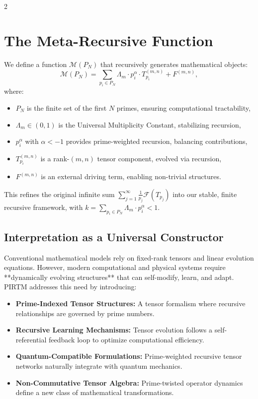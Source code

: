 \documentclass{article}
\theoremstyle{plain}
\begin{document}
\newpage
 \begin{multicols}{2}
\begin{singlespace}
\tableofcontents
\end{singlespace}
\end{multicols}
 \newpage



\section{The Meta-Recursive Function}
We define a function \( \mathcal{M}(P_N) \) that recursively generates mathematical objects:
\begin{equation}
    \mathcal{M}(P_N) = \sum_{p_i \in P_N} \Lambda_m \cdot p_i^\alpha \cdot T_{p_i}^{(m,n)} + F^{(m,n)},
\end{equation}
where:
\begin{itemize}
    \item \( P_N \) is the finite set of the first \( N \) primes, ensuring computational tractability,
    \item \( \Lambda_m \in (0, 1) \) is the Universal Multiplicity Constant, stabilizing recursion,
    \item \( p_i^\alpha \) with \( \alpha < -1 \) provides prime-weighted recursion, balancing contributions,
    \item \( T_{p_i}^{(m,n)} \) is a rank-$(m,n)$ tensor component, evolved via recursion,
    \item \( F^{(m,n)} \) is an external driving term, enabling non-trivial structures.
\end{itemize}
This refines the original infinite sum \( \sum_{j=1}^\infty \frac{1}{p_j} \mathcal{F}(T_{p_j}) \) into our stable, finite recursive framework, with \( k = \sum_{p_i \in P_N} \Lambda_m \cdot p_i^\alpha < 1 \).

\subsection{Interpretation as a Universal Constructor}
Conventional mathematical models rely on fixed-rank tensors and linear evolution equations. However, modern computational and physical systems require **dynamically evolving structures** that can self-modify, learn, and adapt. PIRTM addresses this need by introducing:
\begin{itemize}
    \item \textbf{Prime-Indexed Tensor Structures:} A tensor formalism where recursive relationships are governed by prime numbers.
    \item \textbf{Recursive Learning Mechanisms:} Tensor evolution follows a self-referential feedback loop to optimize computational efficiency.
    \item \textbf{Quantum-Compatible Formulations:} Prime-weighted recursive tensor networks naturally integrate with quantum mechanics.
    \item \textbf{Non-Commutative Tensor Algebra:} Prime-twisted operator dynamics define a new class of mathematical transformations.
\end{itemize}
\end{document}
